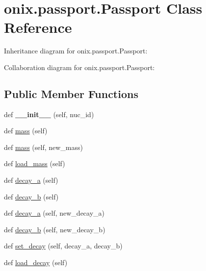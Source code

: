 \hypertarget{classonix_1_1passport_1_1Passport}{}\section{onix.\+passport.\+Passport Class Reference}
\label{classonix_1_1passport_1_1Passport}


Inheritance diagram for onix.\+passport.\+Passport\+:


Collaboration diagram for onix.\+passport.\+Passport\+:
\subsection*{Public Member Functions}
\begin{DoxyCompactItemize}
\item 
\mbox{\label{classonix_1_1passport_1_1Passport_adf22439d0556bf5ef26014248a0f9b95}} 
def {\bfseries \+\_\+\+\_\+init\+\_\+\+\_\+} (self, nuc\+\_\+id)
\item 
def \hyperlink{classonix_1_1passport_1_1Passport_aeaf86019a32f85ceb44fe3b03d616698}{mass} (self)
\item 
def \hyperlink{classonix_1_1passport_1_1Passport_a692af8e5326c8550dde51fd843aaa033}{mass} (self, new\+\_\+mass)
\item 
def \hyperlink{classonix_1_1passport_1_1Passport_ab689c3046aa1fc714076a48f1564e5ee}{load\+\_\+mass} (self)
\item 
def \hyperlink{classonix_1_1passport_1_1Passport_a297a0572f03d763e007dc656d32dc829}{decay\+\_\+a} (self)
\item 
def \hyperlink{classonix_1_1passport_1_1Passport_abbd47a2a4eea4d19119d7f321b4133fa}{decay\+\_\+b} (self)
\item 
def \hyperlink{classonix_1_1passport_1_1Passport_ae7d741a23befd16c05786249ce3ce568}{decay\+\_\+a} (self, new\+\_\+decay\+\_\+a)
\item 
def \hyperlink{classonix_1_1passport_1_1Passport_a8e24b6423404546fd7acc6e7620c3fbd}{decay\+\_\+b} (self, new\+\_\+decay\+\_\+b)
\item 
def \hyperlink{classonix_1_1passport_1_1Passport_a3ae1a55867af7d63e5f555ba3cb1b87b}{set\+\_\+decay} (self, decay\+\_\+a, decay\+\_\+b)
\item 
def \hyperlink{classonix_1_1passport_1_1Passport_a83cc5a53c6bba94690ac0e20e3aca183}{load\+\_\+decay} (self)
\item 

\end{DoxyCompactItemize}
